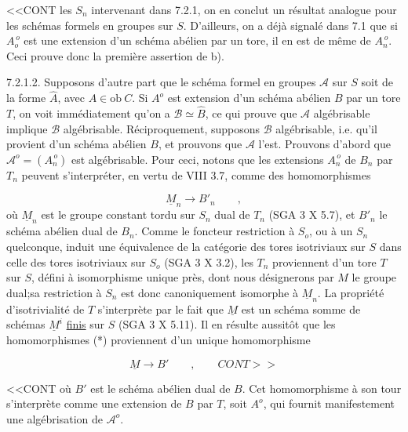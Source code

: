 
<<CONT les $S_n$ intervenant dans 7.2.1, on en conclut un résultat analogue pour les schémas formels en groupes sur $S$. D'ailleurs, on a déjà signalé dans 7.1 que si $A_o^{\,o}$ est une extension d'un schéma abélien par un tore, il en est de même de $A_n^{\,o}$. Ceci prouve donc la première assertion de b).

7.2.1.2. Supposons d'autre part que le schéma formel en groupes $\mathcal{A}$ sur $S$ soit de la forme $\hat{A}$, avec $A \in \mathrm{ob}\ C$. Si $A^o$ est extension d'un schéma abélien $B$ par un tore $T$, on voit immédiatement qu'on a $\mathcal{B} \simeq \hat{B}$, ce qui prouve que $\mathcal{A}$ algébrisable implique $\mathcal{B}$ algébrisable. Réciproquement, supposons $\mathcal{B}$ algébrisable, i.e. qu'il provient d'un schéma abélien $B$, et prouvons que $\mathcal{A}$ l'est. Prouvons d'abord que $\mathcal{A}^o = (A_n^{\,o})$ est algébrisable. Pour ceci, notons que les extensions $A_n^{\,o}$ de $B_n$ par $T_n$ peuvent s'interpréter, en vertu de VIII 3.7, comme des homomorphismes

\begin{equation}\tag{*}
\underline{M}_n \longrightarrow B'_n \qquad ,
\end{equation}
où $\underline{M}_n$ est le groupe constant tordu sur $S_n$ dual de $T_n$ (SGA 3 X 5.7), et $B'_n$ le schéma abélien dual de $B_n$. Comme le foncteur restriction à $S_o$, ou à un $S_n$ quelconque, induit une équivalence de la catégorie des tores isotriviaux sur $S$ dans celle des tores isotriviaux sur $S_o$ (SGA 3 X 3.2), les $T_n$ proviennent d'un tore $T$ sur $S$, défini à isomorphisme unique près, dont nous désignerons par $M$ le groupe dual;sa restriction à $S_n$ est donc canoniquement isomorphe à $\underline{M}_n$. La propriété d'isotrivialité de $T$ s'interprète par le fait que $\underline{M}$ est un schéma somme de schémas $\underline{M}^i$ \underline{finis} sur $S$ (SGA 3 X 5.11). Il en résulte aussitôt que les homomorphismes (*) proviennent d'un unique homomorphisme

\begin{equation}\tag{**}
\underline{M} \longrightarrow B' \qquad , \qquad CONT>>
\end{equation}


<<CONT où $B'$ est le schéma abélien dual de $B$. Cet homomorphisme à son tour s'interprète comme une extension de $B$ par $T$, soit $A^{o}$, qui fournit manifestement une algébrisation de $\mathcal{A}^{o}$.

